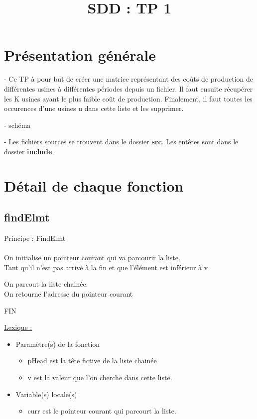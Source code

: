 \documentclass[a4paper]{article}
\title{SDD : TP 1}
\newcommand\tab[1][1cm]{\hspace*{#1}}
\begin{document}
\maketitle
\section*{Présentation générale}
- Ce TP à pour but de créer une matrice représentant des coûts de production de différentes usines à différentes périodes depuis un fichier. Il faut ensuite récupérer les K usines ayant le plus faible coût de production. Finalement, il faut toutes les occurences d'une usines u dans cette liste et les supprimer.

- schéma 


- Les fichiers sources se trouvent dans le dossier \textbf{src}. Les entêtes sont dans le dossier \textbf{include}.
\section{Détail de chaque fonction}
\subsection{findElmt}
\begin{algorithm}
Principe : FindElmt
\\
\\
\tab On initialise un pointeur courant qui va parcourir la liste. 
\\
\tab Tant qu'il n'est pas arrivé à la fin et que l'élément est inférieur à v 

\tab \tab On parcout la liste chainée.
\\
\tab On retourne l'adresse du pointeur courant 

FIN
\end{algorithm}
\underline{Lexique :}
\begin{itemize}
\item Paramètre(s) de la fonction  
\begin{itemize}
\item pHead est la tête fictive de la liste chainée
\item v est la valeur que l'on cherche dans cette liste.
\end{itemize}
\item Variable(s) locale(s)
\begin{itemize}
\item curr est le pointeur courant qui parcourt la liste.
\end{itemize}
\end{itemize}
\end{document}
